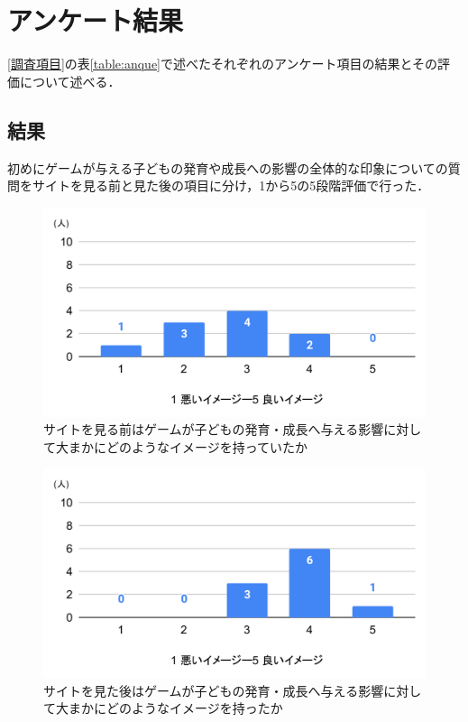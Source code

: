 \documentclass[12pt,a4j,titlepage]{ltjsarticle}
\begin{document}
\clearpage
\section{アンケート結果}
\ref{調査項目}の表\ref{table:anque}で述べたそれぞれのアンケート項目の結果とその評価について述べる．

\subsection{結果}
初めにゲームが与える子どもの発育や成長への影響の全体的な印象についての質問をサイトを見る前と見た後の項目に分け，1から5の5段階評価で行った．


\begin{figure}[H]
 \begin{center}
  \includegraphics[keepaspectratio, scale=0.6]{PDF/印象前.pdf}
 \end{center}
 \caption{サイトを見る前はゲームが子どもの発育・成長へ与える影響に対して大まかにどのようなイメージを持っていたか}
 \label{fig:見る前印象}
\end{figure}

\begin{figure}[H]
 \begin{center}
  \includegraphics[keepaspectratio, scale=0.6]{PDF/印象後.pdf}
 \end{center}
 \caption{サイトを見た後はゲームが子どもの発育・成長へ与える影響に対して大まかにどのようなイメージを持ったか}
 \label{fig:見た後印象}
\end{figure}
\end{document}
